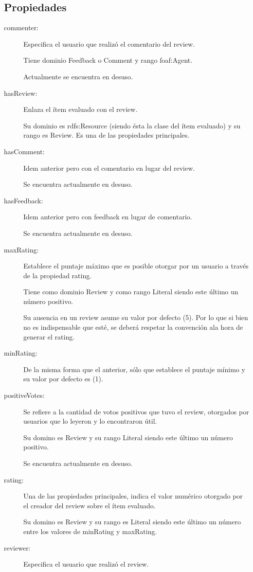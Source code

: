 \subsection{Propiedades}
 \begin{description}
  \item [commenter:] Especifica el usuario que realizó el comentario del review.
  
  Tiene dominio Feedback o Comment y rango foaf:Agent. 
  
  Actualmente se encuentra en desuso.
  \item [hasReview:] Enlaza el ítem evaluado con el review. 
  
  Su dominio es rdfs:Resource (siendo ésta la clase del ítem evaluado) y su rango es Review. Es una de 
  las propiedades principales. 
  \item [hasComment:] Idem anterior pero con el comentario en lugar del review. 
  
  Se encuentra actualmente en desuso.
  \item [hasFeedback:] Idem anterior pero con feedback en lugar de comentario. 
  
  Se encuentra actualmente en desuso.
  \item [maxRating:] Establece el puntaje máximo que es posible otorgar por un usuario a través de la propiedad rating. 
  
  Tiene como dominio Review y como rango Literal siendo este último un número positivo. 
  
  Su ausencia en un review asume su valor por defecto (5). Por lo que si bien no es indispensable que esté, se deberá respetar 
  la convención ala hora de generar el rating.
  \item [minRating:] De la misma forma que el anterior, sólo que establece el puntaje mínimo y su valor por defecto es (1).
  \item [positiveVotes:] Se refiere a la cantidad de votos positivos que tuvo el review, otorgados por usuarios que lo leyeron y lo 
  encontraron útil. 
  
  Su domino es Review y su rango Literal siendo este último un número positivo. 
  
  Se encuentra actualmente en desuso.
  \item [rating:] Una de las propiedades principales, indica el valor numérico otorgado por el creador del review sobre el ítem evaluado. 
  
  Su domino es Review y su rango es Literal siendo este último un número entre los valores de minRating y maxRating.
  \item [reviewer:] Especifica el usuario que realizó el review. 
  

\end{description}
